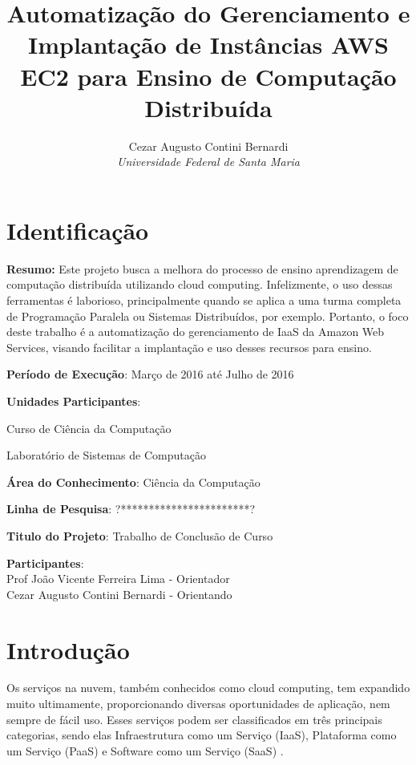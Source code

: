 \documentclass[12pt]{article}
\title{Automatização do Gerenciamento e Implantação de Instâncias AWS EC2 para Ensino de Computação Distribuída}
\author{Cezar Augusto Contini Bernardi \\ \emph{Universidade Federal de Santa Maria}}
\begin{document}
\maketitle


\section{Identificação}

\begin{description} \itemsep 0pt

\item{\textbf{Resumo:}} Este projeto busca a melhora do processo de ensino aprendizagem de computação distribuída utilizando cloud computing. Infelizmente, o uso dessas ferramentas é laborioso, principalmente quando se aplica a uma turma completa de Programação Paralela ou Sistemas Distribuídos, por exemplo. Portanto, o foco deste trabalho é a automatização do gerenciamento de IaaS da Amazon Web Services, visando facilitar a implantação e uso desses recursos para ensino.


\item{\textbf{Período de Execução}}: Março de 2016 até Julho de 2016

\item{\textbf{Unidades Participantes}}: 

    Curso de Ciência da Computação
    
    Laboratório de Sistemas de Computação
    
\item{\textbf{Área do Conhecimento}}: Ciência da Computação

\item{\textbf{Linha de Pesquisa}}: ?***********************?

\item{\textbf{Titulo do Projeto}}: Trabalho de Conclusão de Curso

\item{\textbf{Participantes}}:
\\Prof João Vicente Ferreira Lima - Orientador
\\Cezar Augusto Contini Bernardi - Orientando 
\end{description}


\section{Introdução}

Os serviços na nuvem, também conhecidos como cloud computing, tem expandido muito ultimamente, proporcionando diversas oportunidades de aplicação, nem sempre de fácil uso. Esses serviços podem ser classificados em três principais categorias, sendo elas Infraestrutura como um Serviço (IaaS), Plataforma como um Serviço (PaaS) e Software como um Serviço (SaaS) \cite{xaas}.
\end{document}
